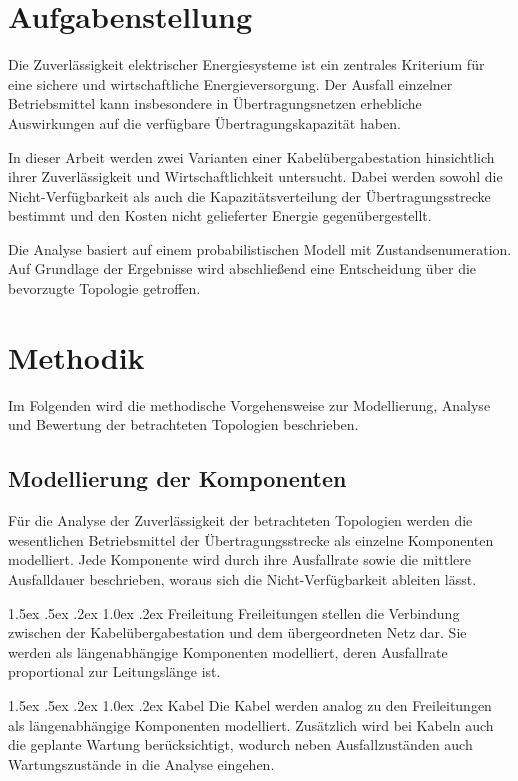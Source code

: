 \documentclass[a4paper,12pt]{article}
\makeatletter
\renewcommand\paragraph{\@startsection{paragraph}{4}{\z@}%
	{1.5ex \@plus .5ex \@minus .2ex}%
	{1.0ex \@plus .2ex}%
	{\normalfont\normalsize\bfseries}}%
\makeatother
\begin{document}
\section{Aufgabenstellung} 

Die Zuverlässigkeit elektrischer Energiesysteme ist ein zentrales
Kriterium für eine sichere und wirtschaftliche Energieversorgung. Der
Ausfall einzelner Betriebsmittel kann insbesondere in
Übertragungsnetzen erhebliche Auswirkungen auf die verfügbare
Übertragungskapazität haben.

In dieser Arbeit werden zwei Varianten einer Kabelübergabestation
hinsichtlich ihrer Zuverlässigkeit und Wirtschaftlichkeit untersucht.
Dabei werden sowohl die Nicht-Verfügbarkeit als auch die
Kapazitätsverteilung der Übertragungsstrecke bestimmt und den Kosten
nicht gelieferter Energie gegenübergestellt.

Die Analyse basiert auf einem probabilistischen Modell mit
Zustandsenumeration. Auf Grundlage der Ergebnisse wird abschließend
eine Entscheidung über die bevorzugte Topologie getroffen.

\section{Methodik}

Im Folgenden wird die methodische Vorgehensweise zur Modellierung, Analyse und
Bewertung der betrachteten Topologien beschrieben. 

\subsection{Modellierung der Komponenten} 

Für die Analyse der Zuverlässigkeit der betrachteten Topologien werden die
wesentlichen Betriebsmittel der Übertragungsstrecke als einzelne Komponenten
modelliert. Jede Komponente wird durch ihre Ausfallrate sowie die mittlere
Ausfalldauer beschrieben, woraus sich die Nicht-Verfügbarkeit ableiten lässt.

\paragraph{Freileitung}
Freileitungen stellen die Verbindung zwischen der Kabelübergabestation und dem
übergeordneten Netz dar. Sie werden als längenabhängige Komponenten modelliert,
deren Ausfallrate proportional zur Leitungslänge ist.

\paragraph{Kabel}
Die Kabel werden analog zu den Freileitungen als
längenabhängige Komponenten modelliert. Zusätzlich wird bei Kabeln auch die
geplante Wartung berücksichtigt, wodurch neben Ausfallzuständen auch
Wartungszustände in die Analyse eingehen.
\end{document}
